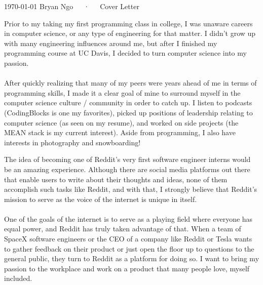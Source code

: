 \documentclass[11pt, a4paper]{awesome-cv}
\begin{document}
    \makecvheader[R]

    \makecvfooter
    {\today}
    {Bryan Ngo~~~·~~~Cover Letter}
    {}

    \makelettertitle

    \begin{cvletter}

        Prior to my taking my first programming class in college, I was unaware careers in computer science, or any type of engineering for that matter.
        I didn't grow up with many engineering influences around me, but after I finished my programming course at UC Davis, I decided to turn computer science into my passion. \\ \\
        After quickly realizing that many of my peers were years ahead of me in terms of programming skills, I made it a clear goal of mine to surround myself in the computer science culture / community in order to catch up.
        I listen to podcasts (CodingBlocks is one my favorites), picked up positions of leadership relating to computer science (as seen on my resume), and worked on side projects (the MEAN stack is my current interest).
        Aside from programming, I also have interests in photography and snowboarding!

        The idea of becoming one of Reddit's very first software engineer interns would be an amazing experience.
        Although there are social media platforms out there that enable users to write about their thoughts and ideas, none of them accomplish such tasks like Reddit, and with that, I strongly believe that Reddit's mission to serve as the voice of the internet is unique in itself. \\ \\
        One of the goals of the internet is to serve as a playing field where everyone has equal power, and Reddit has truly taken advantage of that.
        When a team of SpaceX software engineers or the CEO of a company like Reddit or Tesla wants to gather feedback on their product or just open the floor up to questions to the general public, they turn to Reddit as a platform for doing so.
        I want to bring my passion to the workplace and work on a product that many people love, myself included.


\end{cvletter}
\end{document}
